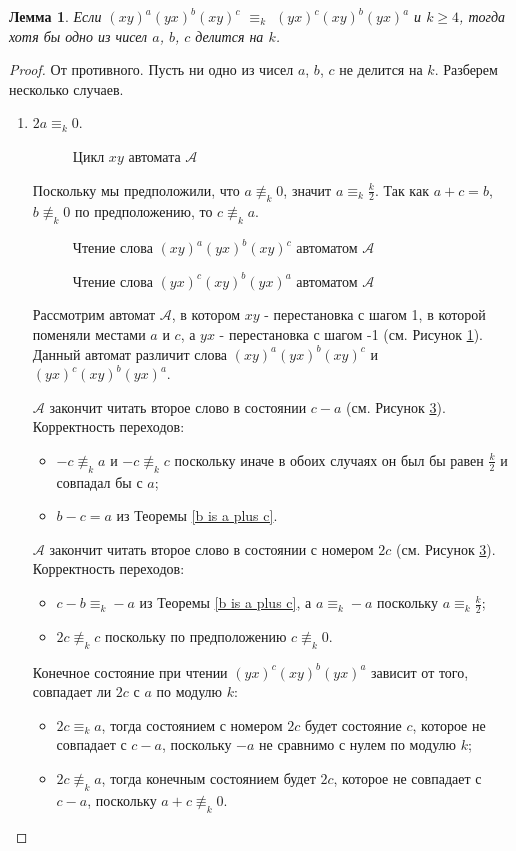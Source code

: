 \documentclass[12pt]{article}
\newtheorem{lemma}{Лемма}
\newcommand{\scalingimage}[3]{
	\begin{figure}
		\center{
			\texttt{[image: \#1]}
		}
		\caption{#3}
		\label{fig:#1}
	\end{figure}
}
\begin{document}
	\begin{lemma}\label{abc div k}
		Если $(xy)^a(yx)^b(xy)^c$ $\equiv_k$ $(yx)^c(xy)^b(yx)^a$ и $k \ge 4$, тогда хотя бы одно из чисел $a$, $b$, $c$ делится на $k$.
	\end{lemma}
	\begin{proof}
		От противного. Пусть ни одно из чисел $a$, $b$, $c$ не делится на $k$. Разберем несколько случаев.
		\begin{enumerate}
			\item $2a \equiv_k 0$.
			\scalingimage{cycle_a_c}{0.5}{Цикл $xy$ автомата $\mathscr{A}$}
			
			Поскольку мы предположили, что $a \not \equiv_k 0$, значит $a \equiv_k \frac{k}{2}$. Так как $a+c=b$, $b \not \equiv_k 0$ по предположению, то $c \not \equiv_k a$.
			
			\scalingimage{process1_a_c}{0.5}{Чтение слова $(xy)^a(yx)^b(xy)^c$ автоматом $\mathscr{A}$}
			\scalingimage{process2_a_c}{0.5}{Чтение слова $(yx)^c(xy)^b(yx)^a$ автоматом $\mathscr{A}$}
			
			Рассмотрим автомат $\mathscr{A}$, в котором $xy$ - перестановка с шагом 1, в которой поменяли местами $a$ и $c$, а $yx$ - перестановка с шагом -1 (см. Рисунок \ref{fig:cycle_a_c}). Данный автомат различит слова $(xy)^a(yx)^b(xy)^c$ и $(yx)^c(xy)^b(yx)^a$. 
						
			$\mathscr{A}$ закончит читать второе слово в состоянии $c-a$ (см. Рисунок \ref{fig:process2_a_c}).
			Корректность переходов:
			\begin{itemize}
				\item $-c \not \equiv_k a$ и $-c \not \equiv_k c$ поскольку иначе в обоих случаях он был бы равен $\frac{k}{2}$ и совпадал бы с $a$;
				\item $b-c = a$ из Теоремы \ref{b is a plus c}.
			\end{itemize}
			
			$\mathscr{A}$ закончит читать второе слово в состоянии с номером $2c$ (см. Рисунок \ref{fig:process2_a_c}).
			Корректность переходов:
			\begin{itemize}
				\item $c-b \equiv_k -a$ из Теоремы \ref{b is a plus c}, а $a \equiv_k -a$ поскольку $a \equiv_k \frac{k}{2}$;
				\item $2c \not \equiv_k c$ поскольку по предположению $c \not \equiv_k 0$.
			\end{itemize}
			Конечное состояние при чтении $(yx)^c(xy)^b(yx)^a$ зависит от того, совпадает ли $2c$ с $a$ по модулю $k$:
			\begin{itemize}
				\item $2c \equiv_k a$, тогда состоянием с номером $2c$ будет состояние $c$, которое не совпадает с $c-a$, поскольку $-a$ не сравнимо с нулем по модулю $k$;
				\item $2c \not \equiv_k a$, тогда конечным состоянием будет $2c$, которое не совпадает с $c-a$, поскольку $a+c \not \equiv_k 0$.
			\end{itemize}
			

\end{enumerate}
\end{proof}
\end{document}
